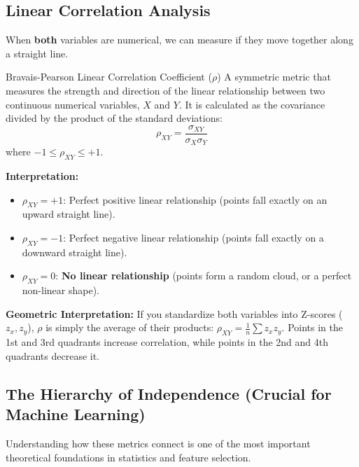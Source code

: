 
\subsection{Linear Correlation Analysis}

When \textbf{both} variables are numerical, we can measure if they move together along a straight line.



\begin{defbox}{Bravais-Pearson Linear Correlation Coefficient ($\rho$)}
A symmetric metric that measures the strength and direction of the linear relationship between two continuous numerical variables, $X$ and $Y$. It is calculated as the covariance divided by the product of the standard deviations:
\begin{equation}
    \rho_{XY} = \frac{\sigma_{XY}}{\sigma_X \sigma_Y}
\end{equation}
where $-1 \leq \rho_{XY} \leq +1$.
\end{defbox}

\textbf{Interpretation:}
\begin{itemize}
    \item $\rho_{XY} = +1$: Perfect positive linear relationship (points fall exactly on an upward straight line).
    \item $\rho_{XY} = -1$: Perfect negative linear relationship (points fall exactly on a downward straight line).
    \item $\rho_{XY} = 0$: \textbf{No linear relationship} (points form a random cloud, or a perfect non-linear shape).
\end{itemize}

\textbf{Geometric Interpretation:} 
If you standardize both variables into Z-scores ($z_x, z_y$), $\rho$ is simply the average of their products: $\rho_{XY} = \frac{1}{n} \sum z_x z_y$. Points in the 1st and 3rd quadrants increase correlation, while points in the 2nd and 4th quadrants decrease it.

\vspace{0.3cm}
\subsection{The Hierarchy of Independence (Crucial for Machine Learning)}

Understanding how these metrics connect is one of the most important theoretical foundations in statistics and feature selection. 

